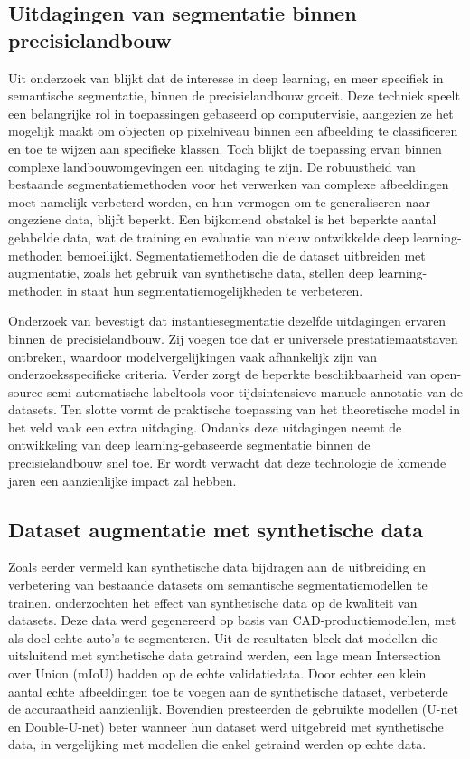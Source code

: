 \subsection{Uitdagingen van segmentatie binnen precisielandbouw}
Uit onderzoek van \textcite{Luo2024} blijkt dat de interesse in deep learning, en meer specifiek in semantische segmentatie, binnen de precisielandbouw groeit. Deze techniek speelt een belangrijke rol in toepassingen gebaseerd op computervisie, aangezien ze het mogelijk maakt om objecten op pixelniveau binnen een afbeelding te classificeren en toe te wijzen aan specifieke klassen. Toch blijkt de toepassing ervan binnen complexe landbouwomgevingen een uitdaging te zijn. De robuustheid van bestaande segmentatiemethoden voor het verwerken van complexe afbeeldingen moet namelijk verbeterd worden, en hun vermogen om te generaliseren naar ongeziene data, blijft beperkt. Een bijkomend obstakel is het beperkte aantal gelabelde data, wat de training en evaluatie van nieuw ontwikkelde deep learning-methoden bemoeilijkt. Segmentatiemethoden die de dataset uitbreiden met augmentatie, zoals het gebruik van synthetische data, stellen deep learning-methoden in staat hun segmentatiemogelijkheden te verbeteren.

Onderzoek van \textcite{Charisis2024} bevestigt dat instantiesegmentatie dezelfde uitdagingen ervaren binnen de precisielandbouw. Zij voegen toe dat er universele prestatiemaatstaven ontbreken, waardoor modelvergelijkingen vaak afhankelijk zijn van onderzoeksspecifieke criteria. Verder zorgt de beperkte beschikbaarheid van open-source semi-automatische labeltools voor tijdsintensieve manuele annotatie van de datasets. Ten slotte vormt de praktische toepassing van het theoretische model in het veld vaak een extra uitdaging. Ondanks deze uitdagingen neemt de ontwikkeling van deep learning-gebaseerde segmentatie binnen de precisielandbouw snel toe. Er wordt verwacht dat deze technologie de komende jaren een aanzienlijke impact zal hebben.

\subsection{Dataset augmentatie met synthetische data}
Zoals eerder vermeld kan synthetische data bijdragen aan de uitbreiding en verbetering van bestaande datasets om semantische segmentatiemodellen te trainen. \textcite{Anderson2022} onderzochten het effect van synthetische data op de kwaliteit van datasets. Deze data werd gegenereerd op basis van CAD-productiemodellen, met als doel echte auto's te segmenteren. Uit de resultaten bleek dat modellen die uitsluitend met synthetische data getraind werden, een lage mean Intersection over Union (mIoU) hadden op de echte validatiedata. Door echter een klein aantal echte afbeeldingen toe te voegen aan de synthetische dataset, verbeterde de accuraatheid aanzienlijk. Bovendien presteerden de gebruikte modellen (U-net en Double-U-net) beter wanneer hun dataset werd uitgebreid met synthetische data, in vergelijking met modellen die enkel getraind werden op echte data.

